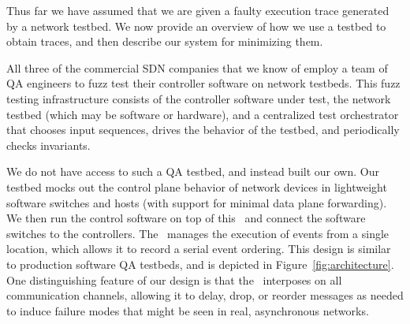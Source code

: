 
Thus far we have assumed that we are given a faulty execution
trace generated by a network testbed. We now provide an overview of
how we use a testbed to obtain traces, and then describe our system for
minimizing them.

 All three of the commercial SDN companies
that we know of employ a team of QA
engineers to fuzz test their controller software on network testbeds.
This fuzz testing infrastructure
consists of the controller software under test, the network testbed (which may
be software or hardware), and a centralized
test orchestrator
that chooses input sequences, drives the behavior of the testbed,
and periodically checks invariants.%


We do not have access to such a QA testbed, and instead built our own.
Our testbed mocks out the control plane
behavior of network devices in lightweight software switches and hosts (with
support for minimal data plane forwarding).
We then run the control software on
top of this \tester~and connect the software switches to the
controllers. The \tester~manages the execution of events from a single location,
which allows it to record a serial
event ordering. This design is similar to production software QA testbeds, and is
depicted in Figure~\ref{fig:architecture}. One distinguishing feature of our
design is that
the \tester~interposes on all communication
channels, allowing it to delay, drop, or reorder
messages as needed to induce failure modes that might be seen in
real, asynchronous networks.


